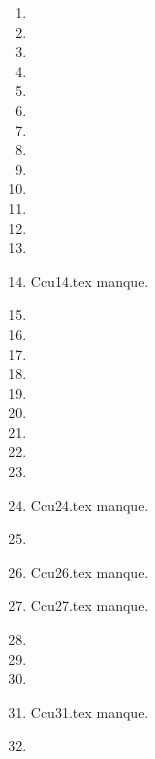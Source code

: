 \begin{enumerate}
  \item  
  \item  
  \item  
  \item  
  \item  
  \item  
  \item  
  \item  
  \item  
  \item  
  \item  
  \item  
  \item  
  \item Ccu14.tex manque. 
  \item  
  \item  
  \item  
  \item  
  \item  
  \item  
  \item  
  \item  
  \item  
  \item Ccu24.tex manque. 
  \item  
  \item Ccu26.tex manque. 
  \item Ccu27.tex manque. 
  \item  
  \item  
  \item  
  \item Ccu31.tex manque. 
  \item  
\end{enumerate} 
